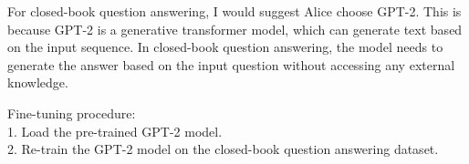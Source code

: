 \documentclass[a4 paper,12pt]{article}
\begin{document}
For closed-book question answering, 
I would suggest Alice choose GPT-2. 
This is because GPT-2 is a generative transformer model,
 which can generate text based on the input sequence.
  In closed-book question answering,
   the model needs to generate the answer 
   based on the input question without accessing 
   any external knowledge.

Fine-tuning procedure:\\
1. Load the pre-trained GPT-2 model.\\
2. Re-train the GPT-2 model on the closed-book question 
answering dataset.\\
\end{document}
